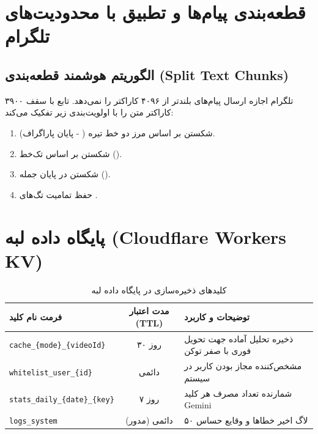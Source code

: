 \documentclass[11pt,a4paper]{report}
\begin{document}
\chapter{قطعه‌بندی پیام‌ها و تطبیق با محدودیت‌های تلگرام}

\section{الگوریتم هوشمند قطعه‌بندی (Split Text Chunks)}
تلگرام اجازه ارسال پیام‌های بلندتر از ۴۰۹۶ کاراکتر را نمی‌دهد. تابع  با سقف ۳۹۰۰ کاراکتر متن را با اولویت‌بندی زیر تفکیک می‌کند:
\begin{enumerate}
    \item شکستن بر اساس مرز دو خط تیره ( - پایان پاراگراف).
    \item شکستن بر اساس تک‌خط ().
    \item شکستن در پایان جمله ().
    \item حفظ تمامیت تگ‌های .
\end{enumerate}

\chapter{پایگاه داده لبه (Cloudflare Workers KV)}

\begin{table}[htbp]
\centering
\caption{کلیدهای ذخیره‌سازی در پایگاه داده لبه}
\begin{tabular}{p{5.5cm}cp{5cm}}
\toprule
\textbf{فرمت نام کلید} & \textbf{مدت اعتبار (TTL)} & \textbf{توضیحات و کاربرد} \\
\midrule
\texttt{cache\_\{mode\}\_\{videoId\}} & ۳۰ روز & ذخیره تحلیل آماده جهت تحویل فوری با صفر توکن \\
\texttt{whitelist\_user\_\{id\}} & دائمی & مشخص‌کننده مجاز بودن کاربر در سیستم \\
\texttt{stats\_daily\_\{date\}\_\{key\}} & ۷ روز & شمارنده تعداد مصرف هر کلید Gemini \\
\texttt{logs\_system} & دائمی (مدور) & ۵۰ لاگ اخیر خطاها و وقایع حساس \\
\bottomrule
\end{tabular}
\end{table}
\end{document}
